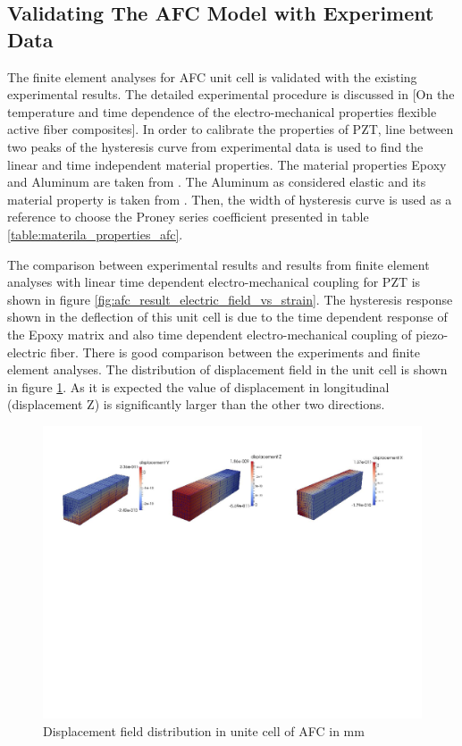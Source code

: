 \subsection{Validating The AFC Model with Experiment Data}
The finite element analyses for AFC unit cell is validated with the existing experimental results.
The detailed experimental procedure is discussed in [On the temperature and time dependence of the electro-mechanical properties flexible active fiber composites].
In order to calibrate the properties of PZT, line between two peaks of the hysteresis curve from experimental data is used to find the linear and time independent material properties.
The material properties Epoxy and Aluminum are taken from \cite{atitallah2014parametric}.
The Aluminum as considered elastic and its material property is taken from \cite{Aluminium_wikipedia}.
Then, the width of hysteresis curve is used as a reference to choose the Proney series coefficient presented in table \ref{table:materila_properties_afc}.
 
The comparison between experimental results and results from finite element analyses with linear time dependent electro-mechanical coupling for PZT is shown in figure \ref{fig:afc_result_electric_field_vs_strain}.
The hysteresis response shown in the deflection of this unit cell is due to the time dependent response of the Epoxy matrix and also time dependent electro-mechanical coupling of piezo-electric fiber. 
There is good comparison between the experiments and finite element analyses.
The distribution of displacement field in the unit cell is shown in figure \ref{afc_displacement_all:fig}.
As it is expected the value of displacement in longitudinal (displacement Z) is significantly larger than the other two directions.

\begin{figure} 
\centering
\includegraphics[trim = 0mm 100mm 0mm 0mm,width=6.0in]{./chap_4_structural_analyses/afc_unit_cell/afc_displacement_all.pdf}
\caption{Displacement field distribution in unite cell of AFC in mm}
\label{afc_displacement_all:fig}
\end{figure}

